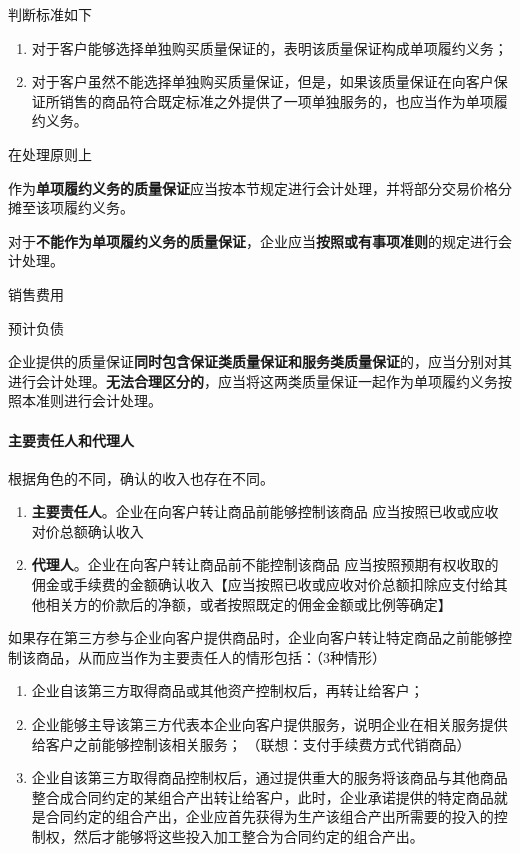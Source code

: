\documentclass[UTF8,12pt]{ctexart}
\newenvironment{Dr}{%
	\begin{list}{}%
		{
			\setlength{\leftmargin}{2em}
			\setlength{\labelwidth}{2em}
			\setlength{\labelsep}{0pt}
			\setlength{\itemindent}{0pt}
			\setlength{\listparindent}{0pt}
			\setlength{\parsep}{0pt}
			\setlength{\topsep}{0pt}
		}
		\item[\textbf{借：}]
	}{%
	\end{list}
}
\newenvironment{Cr}{%
	\begin{list}{}%
		{
			\setlength{\leftmargin}{3em}
			\setlength{\labelwidth}{2em}
			\setlength{\labelsep}{0pt}
			\setlength{\itemindent}{0pt}
			\setlength{\listparindent}{0pt}
			\setlength{\parsep}{0pt}
			\setlength{\topsep}{0pt}
		}
		\item[\textbf{贷：}]
	}{%
	\end{list}
}
\numberwithin{equation}{section} %
\numberwithin{figure}{section}
\numberwithin{table}{section}
\begin{document}
	判断标准如下
	\begin{enumerate}
		\item 对于客户能够选择单独购买质量保证的，表明该质量保证构成单项履约义务；
		
		\item 对于客户虽然不能选择单独购买质量保证，但是，如果该质量保证在向客户保证所销售的商品符合既定标准之外提供了一项单独服务的，也应当作为单项履约义务。
	\end{enumerate}
	
	在处理原则上
	\begin{enumerate}
		\item 作为\textbf{单项履约义务的质量保证}应当按本节规定进行会计处理，并将部分交易价格分摊至该项履约义务。
		
		\item 对于\textbf{不能作为单项履约义务的质量保证}，企业应当\textbf{按照或有事项准则}的规定进行会计处理。
		\begin{Dr}
			销售费用
		\end{Dr}
		\begin{Cr}
			预计负债
		\end{Cr}
	\end{enumerate}	
	
	企业提供的质量保证\textbf{同时包含保证类质量保证和服务类质量保证}的，应当分别对其进行会计处理。\textbf{无法合理区分的}，应当将这两类质量保证一起作为单项履约义务按照本准则进行会计处理。
	
	\paragraph{主要责任人和代理人}
	根据角色的不同，确认的收入也存在不同。
	\begin{enumerate}
		\item \textbf{主要责任人}。企业在向客户转让商品前能够控制该商品	应当按照已收或应收对价总额确认收入
		
		\item \textbf{代理人}。企业在向客户转让商品前不能控制该商品	应当按照预期有权收取的佣金或手续费的金额确认收入【应当按照已收或应收对价总额扣除应支付给其他相关方的价款后的净额，或者按照既定的佣金金额或比例等确定】
	\end{enumerate}
	
	如果存在第三方参与企业向客户提供商品时，企业向客户转让特定商品之前能够控制该商品，从而应当作为主要责任人的情形包括：（3种情形）
	\begin{enumerate}
		\item 企业自该第三方取得商品或其他资产控制权后，再转让给客户；
		
		\item 企业能够主导该第三方代表本企业向客户提供服务，说明企业在相关服务提供给客户之前能够控制该相关服务； （联想：支付手续费方式代销商品）
		
		\item 企业自该第三方取得商品控制权后，通过提供重大的服务将该商品与其他商品整合成合同约定的某组合产出转让给客户，此时，企业承诺提供的特定商品就是合同约定的组合产出，企业应首先获得为生产该组合产出所需要的投入的控制权，然后才能够将这些投入加工整合为合同约定的组合产出。
	\end{enumerate}
	
\end{document}
